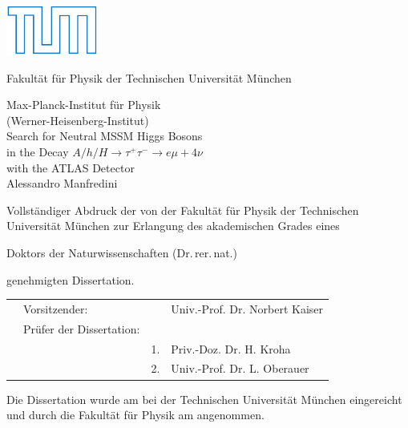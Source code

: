 \thispagestyle{empty}
  \begin{center}
        \includegraphics[height=1.cm]{logos/TUMLogo_oZ_Outline_blau_CMYK.pdf}      


        \Large Fakult\"at f\"ur Physik der Technischen Universit\"at M\"unchen \\       
        \vspace*{3ex}

        \Large Max-Planck-Institut f\"{u}r Physik \\       
        \Large (Werner-Heisenberg-Institut) \\[3ex]

        {\LARGE Search for Neutral MSSM Higgs Bosons \\in the Decay $A/h/H \rightarrow \tau^+ \tau^- \rightarrow e\mu + 4\nu$ \\with the ATLAS Detector}\\[5ex] 

  	\Large Alessandro Manfredini\\[8ex]

  \end{center}


Vollst\"{a}ndiger Abdruck der von der Fakult\"{a}t f\"{u}r Physik
der Technischen Universit\"{a}t M\"{u}nchen zur Erlangung des akademischen Grades eines\vspace{-0.5cm}
\begin{center}
Doktors der Naturwissenschaften (Dr.\,rer.\,nat.)\vspace{-0.5cm}%
\end{center}
genehmigten Dissertation.\\[4ex]

\begin{tabular}{clll}
   &Vorsitzender:            &    & Univ.-Prof. Dr. Norbert  Kaiser \\
   &Pr\"{u}fer der Dissertation:  && \\
   &                         & 1. & Priv.-Doz. Dr. H. Kroha \\
   &                         & 2. & Univ.-Prof. Dr. L. Oberauer   \\[3ex]
\end{tabular}


\begin{flushleft}
  Die Dissertation wurde am \submissiondate{} bei der Technischen
  Universit\"{a}t M\"{u}nchen eingereicht und durch die Fakult\"{a}t
  f\"{u}r Physik am \confirmationdate{} angenommen.
\end{flushleft}
\restoregeometry
\clearemptydoublepage

